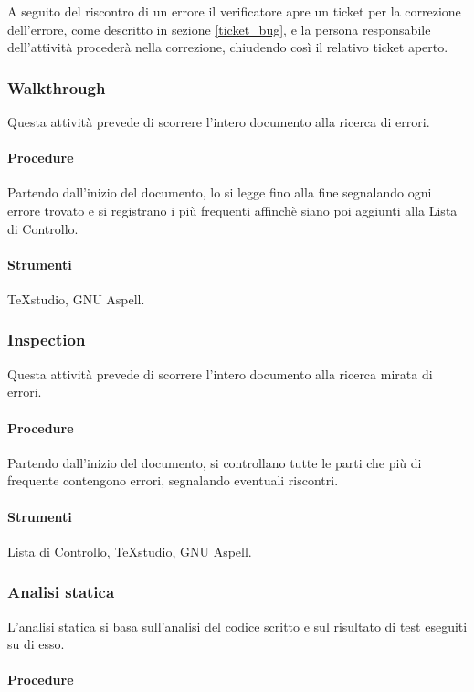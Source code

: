 A seguito del riscontro di un errore il verificatore apre un ticket per la correzione dell'errore, come descritto in sezione \ref{ticket_bug}, e la persona responsabile dell'attività procederà nella correzione, chiudendo così il relativo ticket aperto.




\subsubsection{Walkthrough}
Questa attività prevede di scorrere l'intero documento alla ricerca di errori.
\paragraph{Procedure}

Partendo dall'inizio del documento, lo si legge fino alla fine segnalando ogni errore trovato e si registrano i più frequenti affinchè siano poi aggiunti alla Lista di Controllo.
\paragraph{Strumenti}

TeXstudio, GNU Aspell.

\subsubsection{Inspection}
Questa attività prevede di scorrere l'intero documento alla ricerca mirata di errori.
\paragraph{Procedure}

Partendo dall'inizio del documento, si controllano tutte le parti che più di frequente contengono errori, segnalando eventuali riscontri.
\paragraph{Strumenti}

Lista di Controllo, TeXstudio, GNU Aspell.


\subsubsection{Analisi statica}
L'analisi statica si basa sull'analisi del codice scritto e sul risultato di test eseguiti su di esso.

\paragraph{Procedure}

